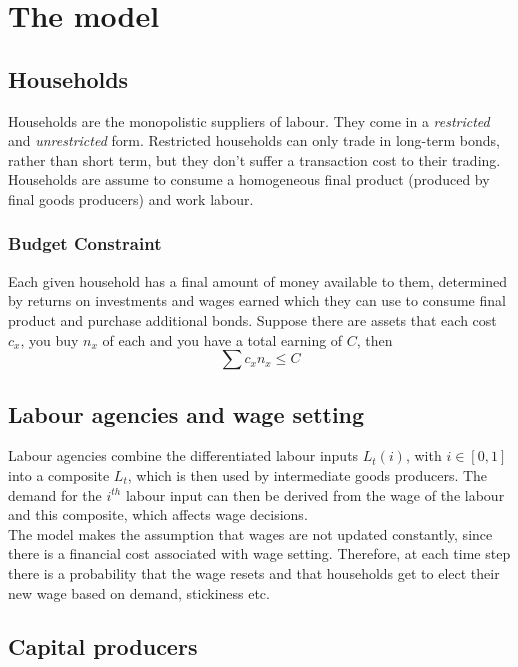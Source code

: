 \documentclass[notitlepage,12pt]{report}
\begin{document}
\section{The model}

\subsection{Households}

Households are the monopolistic suppliers of labour. They come in a {\it restricted} and {\it unrestricted} form. Restricted households can only trade in long-term bonds, rather than short term, but they don't suffer a transaction cost to their trading. Households are assume to consume a homogeneous final product (produced by final goods producers) and work labour.

\subsubsection{Budget Constraint}

Each given household has a final amount of money available to them, determined by returns on investments and wages earned which they can use to consume final product and purchase additional bonds. Suppose there are assets that each cost $c_x$, you buy $n_x$ of each and you have a total earning of $C$, then
$$\sum c_x n_x \leq C$$

\subsection{Labour agencies and wage setting}

Labour agencies combine the differentiated labour inputs $L_t(i)$, with $i\in[0,1]$ into a composite $L_t$, which is then used by intermediate goods producers. The demand for the $i^{th}$ labour input can then be derived from the wage of the labour and this composite, which affects wage decisions.\\

The model makes the assumption that wages are not updated constantly, since there is a financial cost associated with wage setting. Therefore, at each time step there is a probability that the wage resets and that households get to elect their new wage based on demand, stickiness etc.

\subsection{Capital producers}
\end{document}
